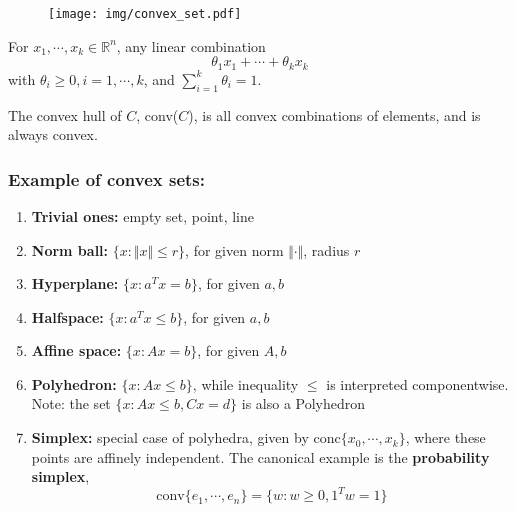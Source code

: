 \documentclass[a4paper]{article}
\begin{document}
{\begin{figure}[htbp] 
  \centering 
  \texttt{[image: img/convex\_set.pdf]} 
\end{figure}

\begin{defi} 
  For $x_1,\cdots,x_k \in \mathbb{R}^n$, any linear combination
  \[
    \theta_1 x_1 + \cdots + \theta_k x_k
    \]
  with $\theta_i \geq 0, i=1,\cdots, k$, and $\sum_{i = 1}^{k}\theta_i = 1$. 
\end{defi}

\begin{defi} 
  The convex hull of $ C $, conv($C$), is all convex combinations of elements, and is always convex.
\end{defi}

\subsubsection{Example of convex sets:}
\begin{enumerate}
  \item \textbf{Trivial ones:} empty set, point, line 
  \item \textbf{Norm ball:} $\{x: \Vert x \Vert \leq r \}$, for given norm $\Vert \cdot \Vert$, radius $r$
  \item \textbf{Hyperplane:} $\{x: a^T x = b \}$, for given $a, b$
  \item \textbf{Halfspace:} $\{x: a^T x \leq b \}$, for given $a, b$
  \item \textbf{Affine space:} $\{x: A x = b \}$, for given $A, b$
  \item \textbf{Polyhedron:} $\{x: A x \leq b \}$, while inequality $\leq$ is interpreted componentwise. Note: the set $\{x: A x \leq b, Cx = d \}$ is also a Polyhedron
  \item \textbf{Simplex:} special case of polyhedra, given by conc$\{x_0,\cdots,x_k \}$, where these points are affinely independent. The canonical example is the \textbf{probability simplex},
  \[
    \text{conv}\{ e_1,\cdots,e_n\} = \{w: w \geq 0, 1^T w = 1\}
    \]
\end{enumerate}

}
\end{document}
